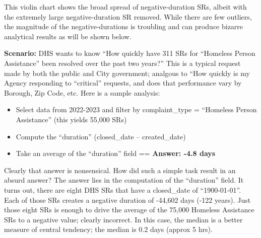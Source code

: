\documentclass[12pt, titlepage]{article}
\begin{document}
	
This violin chart shows the broad spread of negative-duration SRs, albeit with 
the extremely large negative-duration SR removed. While there are few 
outliers, the magnitude of the negative-durations is troubling and can 
produce bizarre analytical results as will be shown below.




\label{sec:homlessassistance}
\textbf{Scenario:} DHS wants to know ``How quickly have 311 SRs
for ``Homeless Person Assistance'' been resolved over the 
past two years?'' This is a typical request made by 
both the public and City government; analgous to ``How quickly 
is my Agency responding to ``critical'' requests, and does 
that performance vary by Borough, Zip Code, etc. Here is a
sample analysis:
		
		
\begin{itemize}
    \item Select data from 2022-2023 and filter by complaint\_type = 
    ``Homeless Person Assistance'' (this yields 55,000 SRs)
    
    \item Compute the ``duration'' (closed\_date – created\_date)
    
    \item Take an average of the ``duration'' field == \textbf{Answer:  -4.8 days}  
\end{itemize}

		
Clearly that answer is nonsensical. How did such a simple task result 
in an absurd answer? The answer lies in the computation of the ``duration'' 
field. It turns out, there are eight DHS SRs that have a closed\_date 
of ``1900-01-01''. Each of those SRs creates a negative duration of -44,602 
days (-122 years). Just those eight SRs is enough to drive the 
average of the 75,000 Homeless Assistance SRs to a negative 
value; clearly incorrect. In this case, the median is a better measure 
of central tendency; the median is  0.2 days (approx 5 hrs). 
\end{document}

